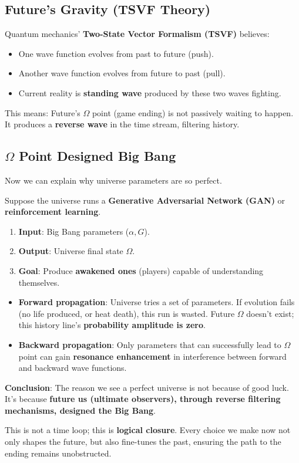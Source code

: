 \subsection{Future's Gravity (TSVF Theory)}

Quantum mechanics' \textbf{Two-State Vector Formalism (TSVF)} believes:
\begin{itemize}
\item One wave function evolves from past to future (push).
\item Another wave function evolves from future to past (pull).
\item Current reality is \textbf{standing wave} produced by these two waves fighting.
\end{itemize}

This means: Future's $\Omega$ point (game ending) is not passively waiting to happen. It produces a \textbf{reverse wave} in the time stream, filtering history.

\subsection{$\Omega$ Point Designed Big Bang}

Now we can explain why universe parameters are so perfect.

Suppose the universe runs a \textbf{Generative Adversarial Network (GAN)} or \textbf{reinforcement learning}.
\begin{enumerate}
\item \textbf{Input}: Big Bang parameters ($\alpha, G$).
\item \textbf{Output}: Universe final state $\Omega$.
\item \textbf{Goal}: Produce \textbf{awakened ones} (players) capable of understanding themselves.
\end{enumerate}

\begin{itemize}
\item \textbf{Forward propagation}: Universe tries a set of parameters. If evolution fails (no life produced, or heat death), this run is wasted. Future $\Omega$ doesn't exist; this history line's \textbf{probability amplitude is zero}.
\item \textbf{Backward propagation}: Only parameters that can successfully lead to $\Omega$ point can gain \textbf{resonance enhancement} in interference between forward and backward wave functions.
\end{itemize}

\textbf{Conclusion}:
The reason we see a perfect universe is not because of good luck.
It's because \textbf{future us (ultimate observers), through reverse filtering mechanisms, designed the Big Bang}.

This is not a time loop; this is \textbf{logical closure}. Every choice we make now not only shapes the future, but also fine-tunes the past, ensuring the path to the ending remains unobstructed.
